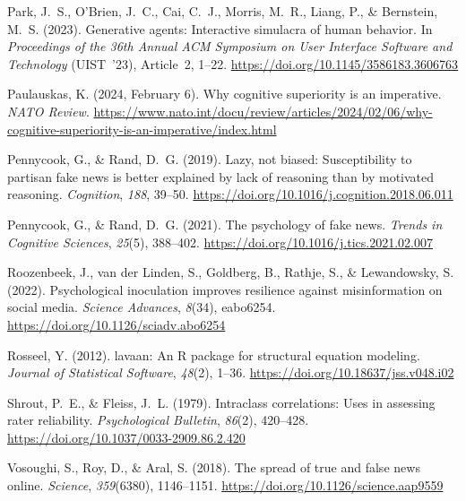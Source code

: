 \documentclass[11pt]{article}
\begin{document}
\noindent Park, J.\ S., O'Brien, J.\ C., Cai, C.\ J., Morris, M.\ R., Liang, P., \& Bernstein, M.\ S. (2023). Generative agents: Interactive simulacra of human behavior. In \textit{Proceedings of the 36th Annual ACM Symposium on User Interface Software and Technology} (UIST~'23), Article~2, 1--22. \url{https://doi.org/10.1145/3586183.3606763}\par

\noindent Paulauskas, K. (2024, February 6). Why cognitive superiority is an imperative. \textit{NATO Review}. \url{https://www.nato.int/docu/review/articles/2024/02/06/why-cognitive-superiority-is-an-imperative/index.html}\par

\noindent Pennycook, G., \& Rand, D.\ G. (2019). Lazy, not biased: Susceptibility to partisan fake news is better explained by lack of reasoning than by motivated reasoning. \textit{Cognition}, \textit{188}, 39--50. \url{https://doi.org/10.1016/j.cognition.2018.06.011}\par

\noindent Pennycook, G., \& Rand, D.\ G. (2021). The psychology of fake news. \textit{Trends in Cognitive Sciences}, \textit{25}(5), 388--402. \url{https://doi.org/10.1016/j.tics.2021.02.007}\par

\noindent Roozenbeek, J., van der Linden, S., Goldberg, B., Rathje, S., \& Lewandowsky, S. (2022). Psychological inoculation improves resilience against misinformation on social media. \textit{Science Advances}, \textit{8}(34), eabo6254. \url{https://doi.org/10.1126/sciadv.abo6254}\par

\noindent Rosseel, Y. (2012). lavaan: An R package for structural equation modeling. \textit{Journal of Statistical Software}, \textit{48}(2), 1--36. \url{https://doi.org/10.18637/jss.v048.i02}\par

\noindent Shrout, P.\ E., \& Fleiss, J.\ L. (1979). Intraclass correlations: Uses in assessing rater reliability. \textit{Psychological Bulletin}, \textit{86}(2), 420--428. \url{https://doi.org/10.1037/0033-2909.86.2.420}\par

\noindent Vosoughi, S., Roy, D., \& Aral, S. (2018). The spread of true and false news online. \textit{Science}, \textit{359}(6380), 1146--1151. \url{https://doi.org/10.1126/science.aap9559}\par

\endgroup
\end{document}
